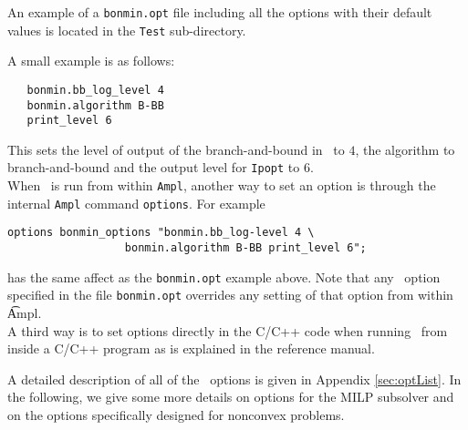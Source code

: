 An example of a {\tt bonmin.opt} file including all the options
with their default values is located in the {\tt Test}
sub-directory.

A small example is as follows:
\begin{verbatim}
   bonmin.bb_log_level 4
   bonmin.algorithm B-BB
   print_level 6
\end{verbatim}
This sets the level of output of the branch-and-bound in \Bonmin\ to $4$, the algorithm to branch-and-bound
and the output level for {\tt Ipopt} to $6$.\\

When \Bonmin\ is run from within {\tt Ampl}, another way to set
an option is through the
internal {\tt Ampl} command {\tt options}.
For example
\begin{verbatim}
options bonmin_options "bonmin.bb_log-level 4 \
                  bonmin.algorithm B-BB print_level 6";
\end{verbatim}
has the same affect as the {\tt bonmin.opt} example above.
Note that any \Bonmin\ option specified in the file {\tt bonmin.opt}
overrides any setting of that option from within {\t Ampl}.\\

A third way is to set options directly in the C/C++ code when
running \Bonmin\ from inside a C/C++ program as is explained in the reference manual.

A detailed description of all of the \Bonmin\ options is given in Appendix \ref{sec:optList}.
In the following, we give some more details on options for the MILP subsolver and
on the options specifically designed
for nonconvex problems.\\

